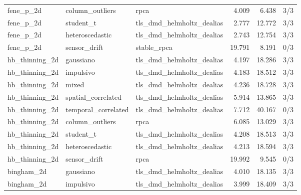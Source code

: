 {\begin{longtable}{p{}p{}p{}rrr}
fene\_\allowbreak p\_\allowbreak 2d & column\_\allowbreak outliers & rpca & 4.009 & 6.438 & 3/3 \\
fene\_\allowbreak p\_\allowbreak 2d & student\_\allowbreak t & tls\_\allowbreak dmd\_\allowbreak helmholtz\_\allowbreak dealias & 2.777 & 12.772 & 3/3 \\
fene\_\allowbreak p\_\allowbreak 2d & heteroscedastic & tls\_\allowbreak dmd\_\allowbreak helmholtz\_\allowbreak dealias & 2.743 & 12.754 & 3/3 \\
fene\_\allowbreak p\_\allowbreak 2d & sensor\_\allowbreak drift & stable\_\allowbreak rpca & 19.791 & 8.191 & 0/3 \\
hb\_\allowbreak thinning\_\allowbreak 2d & gaussiano & tls\_\allowbreak dmd\_\allowbreak helmholtz\_\allowbreak dealias & 4.197 & 18.286 & 3/3 \\
hb\_\allowbreak thinning\_\allowbreak 2d & impulsivo & tls\_\allowbreak dmd\_\allowbreak helmholtz\_\allowbreak dealias & 4.183 & 18.512 & 3/3 \\
hb\_\allowbreak thinning\_\allowbreak 2d & mixed & tls\_\allowbreak dmd\_\allowbreak helmholtz\_\allowbreak dealias & 4.236 & 18.728 & 3/3 \\
hb\_\allowbreak thinning\_\allowbreak 2d & spatial\_\allowbreak correlated & tls\_\allowbreak dmd\_\allowbreak helmholtz\_\allowbreak dealias & 5.914 & 13.865 & 3/3 \\
hb\_\allowbreak thinning\_\allowbreak 2d & temporal\_\allowbreak correlated & tls\_\allowbreak dmd\_\allowbreak helmholtz\_\allowbreak dealias & 7.712 & 40.167 & 0/3 \\
hb\_\allowbreak thinning\_\allowbreak 2d & column\_\allowbreak outliers & rpca & 6.085 & 13.029 & 3/3 \\
hb\_\allowbreak thinning\_\allowbreak 2d & student\_\allowbreak t & tls\_\allowbreak dmd\_\allowbreak helmholtz\_\allowbreak dealias & 4.208 & 18.513 & 3/3 \\
hb\_\allowbreak thinning\_\allowbreak 2d & heteroscedastic & tls\_\allowbreak dmd\_\allowbreak helmholtz\_\allowbreak dealias & 4.213 & 18.594 & 3/3 \\
hb\_\allowbreak thinning\_\allowbreak 2d & sensor\_\allowbreak drift & rpca & 19.992 & 9.545 & 0/3 \\
bingham\_\allowbreak 2d & gaussiano & tls\_\allowbreak dmd\_\allowbreak helmholtz\_\allowbreak dealias & 4.010 & 18.135 & 3/3 \\
bingham\_\allowbreak 2d & impulsivo & tls\_\allowbreak dmd\_\allowbreak helmholtz\_\allowbreak dealias & 3.999 & 18.409 & 3/3 \\

\end{longtable}}

